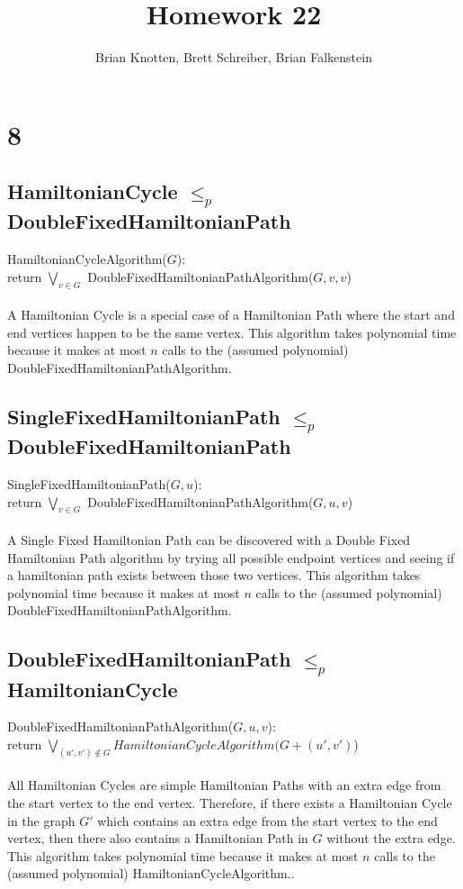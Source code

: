\documentclass[letterpaper,notitlepage,twoside]{article}
\newcommand\tab[1][1cm]{\hspace*{#1}} %
\begin{document}
\title{Homework 22}
\author{Brian Knotten, Brett Schreiber, Brian Falkenstein}
\maketitle
\section*{8}
\subsection*{HamiltonianCycle $\leq_p$ DoubleFixedHamiltonianPath}
HamiltonianCycleAlgorithm($G$):\\
\tab return $\bigvee_{v \in G}$ DoubleFixedHamiltonianPathAlgorithm($G, v, v$)
\\\\
A Hamiltonian Cycle is a special case of a Hamiltonian Path where the start and end vertices happen to be the same vertex. This algorithm takes polynomial time because it makes at most $n$ calls to the (assumed polynomial) DoubleFixedHamiltonianPathAlgorithm.

\subsection*{SingleFixedHamiltonianPath $\leq_p$ DoubleFixedHamiltonianPath}
SingleFixedHamiltonianPath($G, u$):\\
\tab return $\bigvee_{v \in G}$ DoubleFixedHamiltonianPathAlgorithm($G, u, v$)
\\\\
A Single Fixed Hamiltonian Path can be discovered with a Double Fixed Hamiltonian Path algorithm by trying all possible endpoint vertices and seeing if a hamiltonian path exists between those two vertices. This algorithm takes polynomial time because it makes at most $n$ calls to the (assumed polynomial) DoubleFixedHamiltonianPathAlgorithm.

\subsection*{DoubleFixedHamiltonianPath $\leq_p$ HamiltonianCycle}
DoubleFixedHamiltonianPathAlgorithm($G, u, v$):\\
\tab return $\bigvee_{(u', v') \notin G} HamiltonianCycleAlgorithm(G + (u', v')$)
\\\\
All Hamiltonian Cycles are simple Hamiltonian Paths with an extra edge from the start vertex to the end vertex. Therefore, if there exists a Hamiltonian Cycle in the graph $G'$ which contains an extra edge from the start vertex to the end vertex, then there also contains a Hamiltonian Path in $G$ without the extra edge. This algorithm takes polynomial time because it makes at most $n$ calls to the (assumed polynomial) HamiltonianCycleAlgorithm..
\end{document}
